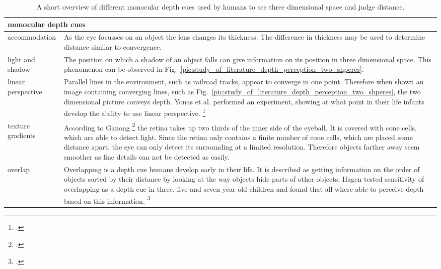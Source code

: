 \begin{table}[h!]
	\begin{tabularx}{\textwidth}{|l|X|}
		\hline
		\multicolumn{2}{|l|}{\textbf{monocular depth cues}} \\
		\hline
		accommodation & As the eye focusses on an object the lens changes its thickness. The difference in thickness may be used to determine distance similar to convergence.
		\\
		\hline
		light and shadow & The position on which a shadow of an object falls can give information on its position in three dimensional space. This phenomenon can be observed in Fig.~\ref{pic:study_of_literature_depth_perception_two_shperes}.
		\\
		\hline
		linear perspective & Parallel lines in the environment, such as railroad tracks, appear to converge in one point. Therefore when shown an image containing converging lines, such as Fig.~\ref{pic:study_of_literature_depth_perception_two_shperes}, the two dimensional picture conveys depth. Yonas et al. performed an experiment, showing at what point in their life infants develop the ability to use linear perspective.  \footcite{Yonas_Infants_distance_perception_from_linear_perspective_and_texture_gradients}
		\\
		\hline
		texture gradients & According to Ganong \footcite{Ganong_Review_of_Medical_Physiology} the retina takes up two thirds of the inner side of the eyeball. It is covered with cone cells, which are able to detect light. Since the retina only contains a finite number of cone cells, which are placed some distance apart, the eye can only detect its surrounding at a limited resolution. Therefore objects farther away seem smoother as fine details can not be detected as easily.
		\\
		\hline
		overlap & Overlapping is a depth cue humans develop early in their life. It is described as getting information on the order of objects sorted by their distance by looking at the way objects hide parts of other objects. Hagen tested sensitivity of overlapping as a depth cue in three, five and seven year old children and found that all where able to perceive depth based on this information. \footcite{Hagen_Development_of_ability_to_perceive_and_produce_pictorial_depth_cue_of_overlapping}
		\\
		\hline
	\end{tabularx}
	\label{tab:study_of_literature_monocular_depth_cues1}
	\caption{A short overview of different monocular depth cues used by humans to see three dimensional space and judge distance.}
\end{table}


